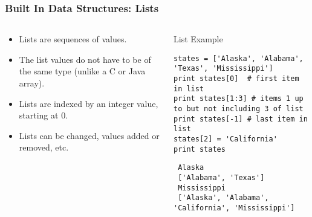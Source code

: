 \documentclass[bigger]{beamer}
\begin{document}
\begin{frame}[fragile]
\frametitle{Built In Data Structures: Lists}
\label{sec-1-5}

   
\begin{columns}
\begin{column}{0.4\textwidth}
\label{sec-1-5-1}

\begin{itemize}
\item Lists are sequences of values.
\item The list values do not have to be of the same type (unlike a C or Java array).
\item Lists are indexed by an integer value, starting at 0.
\item Lists can be changed, values added or removed, etc.
\end{itemize}
\end{column}
\begin{column}{0.6\textwidth}
\begin{block}{List Example}
\label{sec-1-5-2}

\fontsize{6}{7.2}\selectfont

\begin{verbatim}
states = ['Alaska', 'Alabama', 'Texas', 'Mississippi']
print states[0]  # first item in list
print states[1:3] # items 1 up to but not including 3 of list
print states[-1] # last item in list
states[2] = 'California'
print states
\end{verbatim}

\begin{verbatim}
 Alaska
 ['Alabama', 'Texas']
 Mississippi
 ['Alaska', 'Alabama', 'California', 'Mississippi']
\end{verbatim}
\end{block}
\end{column}
\end{columns}
\end{frame}
\end{document}
